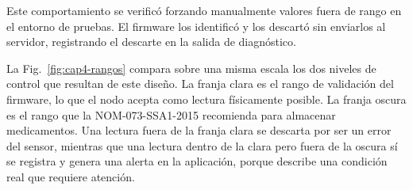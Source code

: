 Este comportamiento se verificó forzando manualmente valores fuera de rango en el entorno de pruebas. El firmware los identificó y los descartó sin enviarlos al servidor, registrando el descarte en la salida de diagnóstico.

La Fig.~\ref{fig:cap4-rangos} compara sobre una misma escala los dos niveles de control que resultan de este diseño. La franja clara es el rango de validación del firmware, lo que el nodo acepta como lectura físicamente posible. La franja oscura es el rango que la NOM-073-SSA1-2015 recomienda para almacenar medicamentos. Una lectura fuera de la franja clara se descarta por ser un error del sensor, mientras que una lectura dentro de la clara pero fuera de la oscura sí se registra y genera una alerta en la aplicación, porque describe una condición real que requiere atención.


